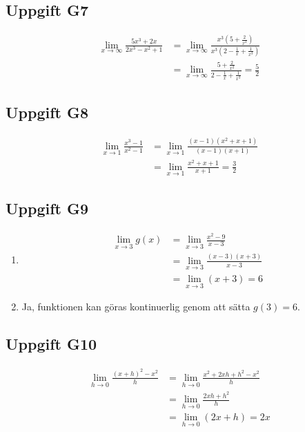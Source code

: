 \documentclass[12pt]{article}
\begin{document}
\subsection*{Uppgift G7}
\begin{align*}
\lim_{x \to \infty} \frac{5x^3 + 2x}{2x^3 - x^2 + 1} &= \lim_{x \to \infty} \frac{x^3(5 + \frac{2}{x^2})}{x^3(2 - \frac{1}{x} + \frac{1}{x^3})} \\
&= \lim_{x \to \infty} \frac{5 + \frac{2}{x^2}}{2 - \frac{1}{x} + \frac{1}{x^3}} = \frac{5}{2}
\end{align*}

\subsection*{Uppgift G8}
\begin{align*}
\lim_{x \to 1} \frac{x^3 - 1}{x^2 - 1} &= \lim_{x \to 1} \frac{(x - 1)(x^2 + x + 1)}{(x - 1)(x + 1)} \\
&= \lim_{x \to 1} \frac{x^2 + x + 1}{x + 1} = \frac{3}{2}
\end{align*}

\subsection*{Uppgift G9}
\begin{enumerate}[label=\alph*)]
    \item 
    \begin{align*}
    \lim_{x \to 3} g(x) &= \lim_{x \to 3} \frac{x^2 - 9}{x - 3} \\
    &= \lim_{x \to 3} \frac{(x - 3)(x + 3)}{x - 3} \\
    &= \lim_{x \to 3} (x + 3) = 6
    \end{align*}
    \item Ja, funktionen kan göras kontinuerlig genom att sätta $g(3) = 6$.
\end{enumerate}

\subsection*{Uppgift G10}
\begin{align*}
\lim_{h \to 0} \frac{(x + h)^2 - x^2}{h} &= \lim_{h \to 0} \frac{x^2 + 2xh + h^2 - x^2}{h} \\
&= \lim_{h \to 0} \frac{2xh + h^2}{h} \\
&= \lim_{h \to 0} (2x + h) = 2x
\end{align*}
\end{document}
